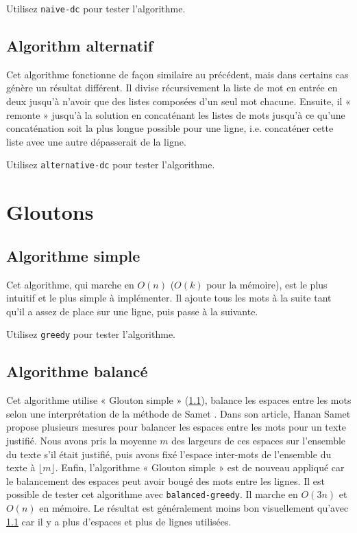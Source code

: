 \documentclass[a4paper, 11pt]{article}
\begin{document}
Utilisez \verb|naive-dc| pour tester l'algorithme.

\subsection{Algorithm alternatif}

Cet algorithme fonctionne de façon similaire au précédent, mais dans certains
cas génère un résultat différent. Il divise récursivement la liste de mot en
entrée en deux jusqu'à n'avoir que des listes composées d'un seul mot chacune.
Ensuite, il « remonte » jusqu'à la solution en concaténant les listes de mots
jusqu'à ce qu'une concaténation soit la plus longue possible pour une ligne,
i.e. concaténer cette liste avec une autre dépasserait de la ligne.

Utilisez \verb|alternative-dc| pour tester l'algorithme.

\section{Gloutons}

\subsection{Algorithme simple}
\label{sec:simple-greedy}

Cet algorithme, qui marche en $O(n)$ ($O(k)$ pour la mémoire), est le plus
intuitif et le plus simple à implémenter. Il ajoute tous les mots à la suite
tant qu'il a assez de place sur une ligne, puis passe à la suivante.

Utilisez \verb|greedy| pour tester l'algorithme.

\subsection{Algorithme balancé}
\label{sec:balanced-greedy}

Cet algorithme utilise « Glouton simple » (\ref{sec:simple-greedy}), balance les
espaces entre les mots selon une interprétation de la méthode de Samet
\cite{Samet82}. Dans son article, Hanan Samet propose plusieurs mesures pour
balancer les espaces entre les mots pour un texte justifié. Nous avons pris la
moyenne $m$ des largeurs de ces espaces sur l'ensemble du texte s'il était
justifié, puis avons fixé l'espace inter-mots de l'ensemble du texte à
$\lfloor m \rfloor$. Enfin, l'algorithme « Glouton simple » est de nouveau
appliqué car le balancement des espaces peut avoir bougé des mots entre les
lignes. Il est possible de tester cet algorithme avec \verb|balanced-greedy|. Il
marche en $O(3n)$ et $O(n)$ en mémoire. Le résultat est généralement moins bon
visuellement qu'avec \ref{sec:simple-greedy} car il y a plus d'espaces et plus
de lignes utilisées.
\end{document}
